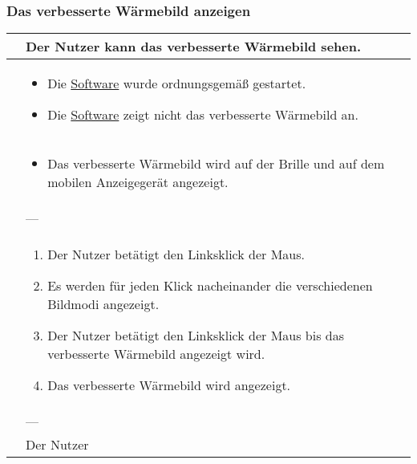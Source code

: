 \subsubsection{Das verbesserte Wärmebild anzeigen}
\begin{center}
	\begin{longtable}{| p{3cm} | p{12cm} |}
		\hline
		\goal & Der Nutzer kann das verbesserte Wärmebild sehen. \\ \hline
		
		\precondition & \begin{itemize}
			\item Die \hyperlink{tab:anwendung}{Software} wurde ordnungsgemäß gestartet.
			\item Die \hyperlink{tab:anwendung}{Software} zeigt nicht das verbesserte Wärmebild an.
		\end{itemize} \\ \hline
		
		\postcondition & \begin{itemize}
			\item Das verbesserte Wärmebild wird auf der Brille und auf dem mobilen Anzeigegerät angezeigt.
		\end{itemize} \\ \hline
		
		\postexception & --- \\ \hline
		
		\flow & \begin{enumerate}
			\item Der Nutzer betätigt den Linksklick der Maus.
			\item Es werden für jeden Klick nacheinander die verschiedenen Bildmodi angezeigt.
			\item Der Nutzer betätigt den Linksklick der Maus bis das verbesserte Wärmebild angezeigt wird.
			\item Das verbesserte Wärmebild wird angezeigt.			
		\end{enumerate} \\ \hline
		
		\exception & --- \\ \hline
		
		\player & Der Nutzer \\
		\hline
	\end{longtable}
\end{center}

